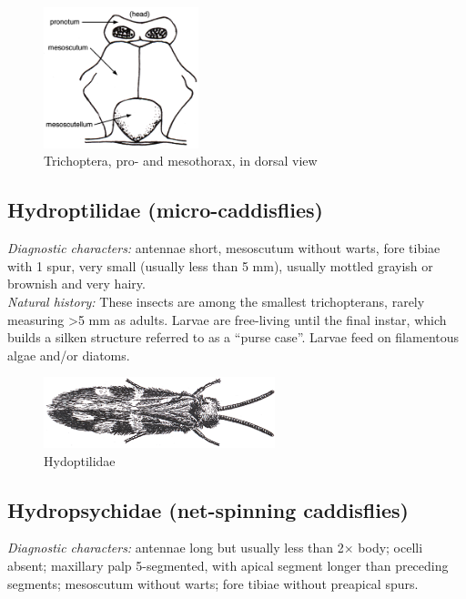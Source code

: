 \documentclass[letterpaper, 11pt]{article}
\begin{document}
\begin{figure}[ht!]
  \centering
    \includegraphics[width=0.4\textwidth]{TrichoImage03}
  \caption{Trichoptera, pro- and mesothorax, in dorsal view}
  \label{fig:caddisthorax}
\end{figure}

\subsection{Hydroptilidae (micro-caddisflies)}
\noindent{}\textit{Diagnostic characters:} antennae short, mesoscutum without warts, fore tibiae with 1 spur, very small (usually less than 5 mm), usually mottled grayish or brownish and very hairy.\\

\noindent{}\textit{Natural history:} These insects are among the smallest trichopterans, rarely measuring \textgreater5 mm as adults. Larvae are free-living until the final instar, which builds a silken structure referred to as a ``purse case''. Larvae feed on filamentous algae and/or diatoms.

\begin{figure}[ht!]
  \centering
    \includegraphics[width=0.6\textwidth]{TrichoImage05}
  \caption{Hydoptilidae}
  \label{fig:hydrop}
\end{figure}

\subsection{Hydropsychidae (net-spinning caddisflies)}
\noindent{}\textit{Diagnostic characters:} antennae long but usually less than 2$\times$ body; ocelli absent; maxillary palp 5-segmented, with apical segment longer than preceding segments; mesoscutum without warts; fore tibiae without preapical spurs.\\
\end{document}
